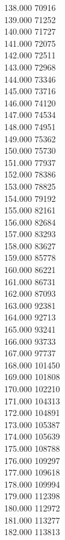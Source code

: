 { 138.000	70916 \\
 139.000	71252 \\
 140.000	71727 \\
 141.000	72075 \\
 142.000	72511 \\
 143.000	72968 \\
 144.000	73346 \\
 145.000	73716 \\
 146.000	74120 \\
 147.000	74534 \\
 148.000	74951 \\
 149.000	75362 \\
 150.000	75730 \\
 151.000	77937 \\
 152.000	78386 \\
 153.000	78825 \\
 154.000	79192 \\
 155.000	82161 \\
 156.000	82684 \\
 157.000	83293 \\
 158.000	83627 \\
 159.000	85778 \\
 160.000	86221 \\
 161.000	86731 \\
 162.000	87093 \\
 163.000	92381 \\
 164.000	92713 \\
 165.000	93241 \\
 166.000	93733 \\
 167.000	97737 \\
 168.000	101450 \\
 169.000	101808 \\
 170.000	102210 \\
 171.000	104313 \\
 172.000	104891 \\
 173.000	105387 \\
 174.000	105639 \\
 175.000	108788 \\
 176.000	109297 \\
 177.000	109618 \\
 178.000	109994 \\
 179.000	112398 \\
 180.000	112972 \\
 181.000	113277 \\
 182.000	113813 \\
}
